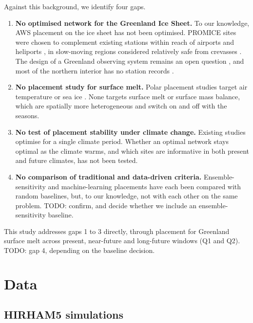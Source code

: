 \documentclass[tc, manuscript]{copernicus}
\providecommand{\tightlist}{\setlength{\itemsep}{0pt}\setlength{\parskip}{0pt}}
\begin{document}
Against this background, we identify four gaps.

\begin{enumerate}
\def\labelenumi{\arabic{enumi}.}
\tightlist
\item
  \textbf{No optimised network for the Greenland Ice Sheet.} To our
  knowledge, AWS placement on the ice sheet has not been optimised.
  PROMICE sites were chosen to complement existing stations within reach
  of airports and heliports \citep{fausto2021}, in slow-moving regions
  considered relatively safe from crevasses \citep{fausto2026}. The
  design of a Greenland observing system remains an open question
  \citep{grioos2019}, and most of the northern interior has no station
  records \citep{wang2026_essd}.
\item
  \textbf{No placement study for surface melt.} Polar placement studies
  target air temperature
  \citep{hakim2020, tardif2022, kim2024, andersson2023} or sea ice
  \citep{kaminski2015, kaminski2018}. None targets surface melt or
  surface mass balance, which are spatially more heterogeneous and
  switch on and off with the seasons.
\item
  \textbf{No test of placement stability under climate change.} Existing
  studies optimise for a single climate period. Whether an optimal
  network stays optimal as the climate warms, and which sites are
  informative in both present and future climates, has not been tested.
\item
  \textbf{No comparison of traditional and data-driven criteria.}
  Ensemble-sensitivity and machine-learning placements have each been
  compared with random baselines, but, to our knowledge, not with each
  other on the same problem. TODO: confirm, and decide whether we
  include an ensemble-sensitivity baseline.
\end{enumerate}

This study addresses gaps 1 to 3 directly, through placement for
Greenland surface melt across present, near-future and long-future
windows (Q1 and Q2). TODO: gap 4, depending on the baseline decision.

\section{Data}\label{data}

\subsection{HIRHAM5 simulations}\label{hirham5-simulations}
\end{document}
